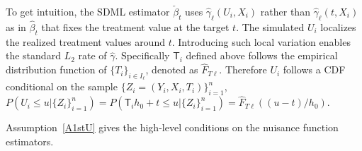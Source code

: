 \documentclass[lettersize, 12pt]{article}
\begin{document}
To get intuition, the SDML estimator $\check\beta_t$ uses $\hat\gamma_\ell(U_i, X_i)$ rather than $\hat\gamma_\ell(t, X_i)$ as in $\hat\beta_t$ that fixes the treatment value at the target $t$.
The simulated $U_i$ localizes the realized treatment values around $t$.
Introducing such local variation enables the standard $L_2$ rate of $\hat\gamma$.
Specifically $\mathsf{T}_i$ defined above follows the empirical distribution function of $\{T_i\}_{i\in I_\ell}$, denoted as $\hat F_{T\ell}$.
Therefore $U_i$ follows a CDF conditional on the sample $\{Z_i=(Y_i, X_i, T_i)\}_{i=1}^n$, $P(U_i \leq u|\{Z_i\}_{i=1}^n) = P(\mathsf{T}_i h_0 + t \leq u|\{Z_i\}_{i=1}^n) = \hat F_{T\ell}((u-t)/h_0)$.
%


Assumption~\ref{A1stU} gives the high-level conditions on the nuisance function estimators.
\end{document}
